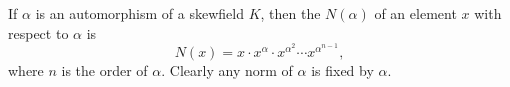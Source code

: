 If $\alpha$ is an automorphism of a skewfield $K$, then the  $N(\alpha)$ of an element $x$ with respect to $\alpha$ is $$N(x) = x \cdot x^\alpha \cdot x^{\alpha^2} \cdots x^{\alpha^{n-1}},$$ where $n$ is the order of $\alpha$. Clearly any norm of $\alpha$ is fixed by $\alpha$.
